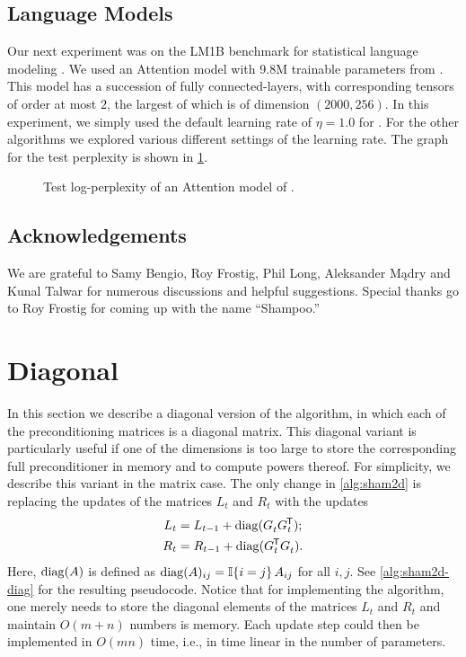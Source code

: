\subsection{Language Models}

Our next experiment was on the LM1B benchmark for statistical language modeling \citep{lm1b}.
We used an Attention model with 9.8M trainable parameters from \cite{vaswani2017attention}. This model has a succession of fully connected-layers, 
with corresponding tensors of order at most $2$, the largest of which is of dimension $(2000, 256)$.
In this experiment, we simply used the default learning rate of $\eta=1.0$ for \NAME. For the other algorithms we explored various different settings of the learning rate.
The graph for the test perplexity is shown in \cref{fig:t2t-neg-log-perplexity}.


\begin{figure}[t!]
\centering
\resizebox{0.5\textwidth}{!}{

}
\caption{Test log-perplexity of an Attention model of \citet{vaswani2017attention}.}
\label{fig:t2t-neg-log-perplexity}
\end{figure}



\subsection*{Acknowledgements}

We are grateful to Samy Bengio, Roy Frostig, Phil Long, Aleksander M\k{a}dry and Kunal Talwar for numerous discussions and helpful suggestions.
Special thanks go to Roy Frostig for coming up with the name ``Shampoo.''





\appendix


\section{Diagonal \NAME}
\label{sec:diagonal}
%
In this section we describe a diagonal version of the \NAME algorithm, in which each of the preconditioning matrices is a diagonal matrix. 
This diagonal variant is particularly useful if one of the dimensions is too large to store the corresponding full preconditioner in memory and to compute powers thereof. 
For simplicity, we describe this variant in the matrix case.
%
The only change in \cref{alg:sham2d} is replacing the updates of the matrices $L_t$ and $R_t$ with the updates
\begin{align*}
L_t &= L_{t-1} + \operatorname*{diag}(G_t^{} G_t^{\mkern-1.5mu\scriptstyle\mathsf{T}}) ;\\
R_t &= R_{t-1} + \operatorname*{diag}(G_t^{\mkern-1.5mu\scriptstyle\mathsf{T}} G_t^{}) .
\end{align*}
Here, $\operatorname*{diag}(A)$ is defined as $\operatorname*{diag}(A)_{ij} = \mathbb{I}\mathopen{}\left\{i=j\right\} A_{ij}$ for all $i,j$.
See \cref{alg:sham2d-diag} for the resulting pseudocode.
Notice that for implementing the algorithm, one merely needs to store the diagonal elements of the matrices $L_t$ and $R_t$ and maintain $O(m+n)$ numbers is memory.
Each update step could then be implemented in $O(mn)$ time, i.e., in time linear in the number of parameters.

